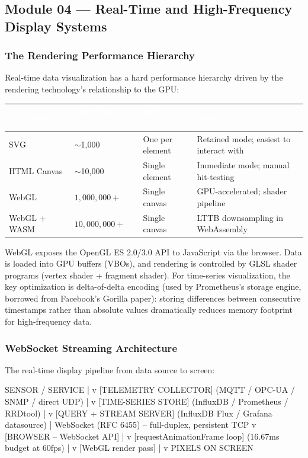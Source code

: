 \documentclass[11pt,letterpaper]{article}
\newcommand{\tableheader}[1]{\textbf{\sffamily\textcolor{white}{#1}}}
\begin{document}
\subsection{Module 04 --- Real-Time and High-Frequency Display Systems}

\subsubsection{The Rendering Performance Hierarchy}

Real-time data visualization has a hard performance hierarchy driven by the rendering technology's relationship to the GPU:

\begin{center}
\begin{tabularx}{\textwidth}{L{2.5cm}C{2.5cm}C{2.5cm}X}
\toprule
{}
\tableheader{Technology} & \tableheader{Max Pts (60fps)} & \tableheader{DOM Nodes} & \tableheader{Notes} \\
\midrule
SVG & $\sim$1,000 & One per element & Retained mode; easiest to interact with \\
HTML Canvas & $\sim$10,000 & Single element & Immediate mode; manual hit-testing \\
WebGL & $1{,}000{,}000+$ & Single canvas & GPU-accelerated; shader pipeline \\
WebGL + WASM & $10{,}000{,}000+$ & Single canvas & LTTB downsampling in WebAssembly \\
\bottomrule
\end{tabularx}
\end{center}

WebGL exposes the OpenGL ES 2.0/3.0 API to JavaScript via the browser. Data is loaded into GPU buffers (VBOs), and rendering is controlled by GLSL shader programs (vertex shader + fragment shader). For time-series visualization, the key optimization is delta-of-delta encoding (used by Prometheus's storage engine, borrowed from Facebook's Gorilla paper): storing differences between consecutive timestamps rather than absolute values dramatically reduces memory footprint for high-frequency data.

\subsubsection{WebSocket Streaming Architecture}

The real-time display pipeline from data source to screen:

\begin{asciibox}
SENSOR / SERVICE
    |
    v
[TELEMETRY COLLECTOR]  (MQTT / OPC-UA / SNMP / direct UDP)
    |
    v
[TIME-SERIES STORE]    (InfluxDB / Prometheus / RRDtool)
    |
    v
[QUERY + STREAM SERVER]  (InfluxDB Flux / Grafana datasource)
    |  WebSocket (RFC 6455) -- full-duplex, persistent TCP
    v
[BROWSER -- WebSocket API]
    |
    v
[requestAnimationFrame loop]  (16.67ms budget at 60fps)
    |
    v
[WebGL render pass]
    |
    v
PIXELS ON SCREEN
\end{asciibox}
\end{document}
